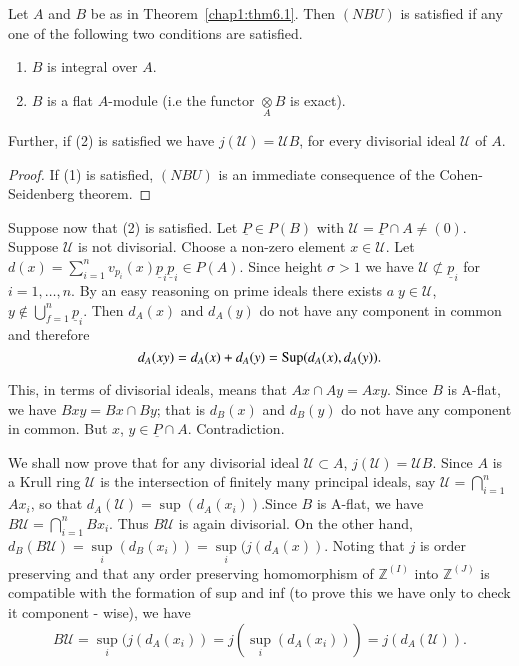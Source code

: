   \begin{theorem}\label{chap1:thm6.2} %
 Let $A$ and $B$ be as in Theorem~\ref{chap1:thm6.1}. Then $(NBU)$ is
  satisfied if any one of the following two conditions are satisfied.
\begin{enumerate}[(1)]
\item $B$ is integral over $A$.

\item $B$ is a flat $A$-module (i.e the functor
  $\underset{A}{\otimes} B$ is exact).  
\end{enumerate}
Further, if (2) is satisfied we have $j(\mathscr{U}) =
    \mathscr{U}B$, for every divisorial ideal $\mathscr{U}$ of $A$. 
  \end{theorem}  
  
\begin{proof} %
If (1) is satisfied, $(NBU)$ is an immediate consequence of the
Cohen-Seidenberg theorem. 
\end{proof}  
  
  Suppose now that (2) is satisfied. Let $\underline{P} \in P(B)$
  with $\mathscr{U} = \underline{P} \cap A \neq (0)$. Suppose $\mathscr{U}$ is
  not divisorial. Choose a non-zero element $x \in \mathscr{U}$. Let $d(x)
  = \sum\limits_{i = 1}^{n} v_{p_i}(x) \underline{p}_i
  \underline{p}_i \in P(A)$. Since height $\sigma > 1$ we have $\mathscr{U}
  \nsubset \underline{p}_i $ for $i = 1, \ldots, n$. By an easy
  reasoning on prime ideals there exists $a \; y \in \mathscr{U}$, $y \notin
  \bigcup\limits_{f  = 1}^{n} \underline{p}_i$. Then $d_A (x)$ and
  $d_A (y)$ do not have any component in common and therefore 
  $$
  d_A (xy) = d_A (x) + d_A (y) = {\rm Sup} (d_A (x), d_A(y)). 
  $$

  \noindent
  This, in terms of divisorial ideals, means that $Ax \cap Ay =
  Axy$. Since $B$ is A-flat, we have $Bxy = Bx \cap By$; that is $d_B
  (x) $ and $d_B (y)$ do not have any component in common. But $x$, $y
  \in \underline{P} \cap A$. Contradiction. 
  
  We shall now prove that for any divisorial ideal $\mathscr{U}
  \subset A$, $j (\mathscr{U}) = \mathscr{U} B$. Since $A$ is a Krull
  ring $\mathscr{U}$ is the intersection of finitely many principal
  ideals, say $\mathscr{U} = \bigcap\limits_{i = 1}^n$ $Ax_i$, so that
  $d_A (\mathscr{U}) = \sup (d_A (x_i))$.\pageoriginale Since $B$ is
  A-flat, we have 
  $B \mathscr{U} = \bigcap\limits_{i = 1}^n Bx_i$. 
  Thus $B \mathscr{U}$ is again divisorial. On the other hand, $d_B (B
  \mathscr{U}) = \sup\limits_i (d_B (x_i)) = \sup\limits_i (j (d_A (x
  ))$.  Noting that $j$ is order preserving and that any order
  preserving homomorphism of $\mathbb{Z}^{(I)}$ into
  $\mathbb{Z}^{(J)}$ is compatible with the formation of sup and inf
  (to prove this we have only to check it component - wise), we have 
  $$
  B \mathscr{U} = \sup\limits_i (j (d_A(x_i)) = j(\sup\limits_{i} (d_A
  (x_i))) = j (d_A (\mathscr{U})). 
  $$
   
